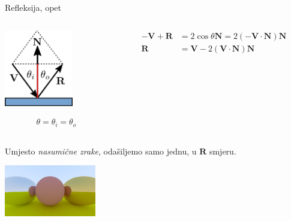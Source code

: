 \documentclass[9pt]{beamer}
\begin{document}
\begin{frame}{Refleksija, opet}
	\begin{columns}
		\begin{column}{0.3\textwidth}
			\begin{center}
				\includegraphics[width=3cm]{slike/refleksija_02.png}
			\end{center}
		\begin{align*}
		\theta= \theta_i = \theta_o
		\end{align*}
		\end{column}
		\begin{column}{0.7\textwidth}
		\begin{align*}
		-\mathbf{V} + \mathbf{R} & = 2 \cos \theta \mathbf{N} = 2(-\mathbf{V} \cdot \mathbf{N})\mathbf{N} \\
		\mathbf{R} & = \mathbf{V} - 2(\mathbf{V} \cdot \mathbf{N})\mathbf{N}
		\end{align*}
		\end{column}
	\end{columns}

Umjesto \textit{nasumične zrake}, odašiljemo samo jednu, u $\mathbf{R}$ smjeru.
\begin{center}
	\includegraphics[width=4cm]{slike/img-1.11-metal-shiny.png}
\end{center}
\end{frame}
\end{document}
